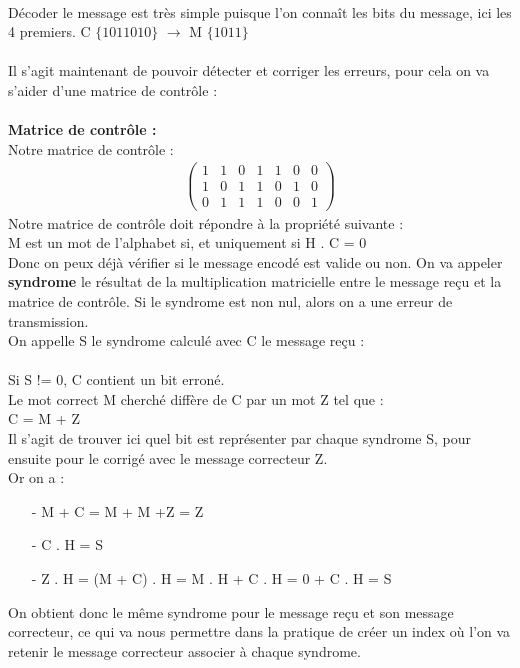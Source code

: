 \\
Décoder le message est très simple puisque l’on connaît les bits du message, ici les 4 premiers. C $\{1011010\}$ $\rightarrow$ M $\{1011\}$\\
\\
Il s’agit maintenant de pouvoir détecter et corriger les erreurs, pour cela on va s’aider d’une matrice de contrôle :
\\
\\ \textbf{Matrice de contrôle :}
\\
Notre matrice de contrôle :\\
\begin{align}
  \left(
  \begin{matrix}
    1 & 1 & 0 & 1 & 1 & 0 & 0 \\
    1 & 0 & 1 & 1 & 0 & 1 & 0 \\
    0 & 1 & 1 & 1 & 0 & 0 & 1
  \end{matrix}
  \right)
\end{align}
Notre matrice de contrôle doit répondre à la propriété suivante :\\
\tab M est un mot de l’alphabet si, et uniquement si H . C = 0
\\Donc on peux déjà vérifier si le message encodé est valide ou non. On va appeler \textbf{syndrome} le résultat de la multiplication matricielle entre le message reçu et la matrice de contrôle. Si le syndrome est non nul, alors on a une erreur de transmission.
\\
On appelle S le syndrome calculé avec C le message reçu :\\
\\
Si S != 0, C contient un bit erroné. \\
Le mot correct M cherché diffère de C par un mot Z tel que :\\
\tab C = M + Z\\
Il s’agit de trouver ici quel bit est représenter par chaque syndrome S, pour ensuite pour le corrigé avec le message correcteur Z.\\
Or on a :\\
\begin{enumerate}
  \item[-] M  + C = M + M +Z = Z
  \item[-] C . H = S
  \item[-] Z . H = (M + C) . H = M . H + C . H = 0 + C . H = S
\end{enumerate}
\newpage
On obtient donc le même syndrome pour le message reçu et son message correcteur, ce qui va nous permettre dans la pratique de créer un index où l’on va retenir le message correcteur associer à chaque syndrome.
